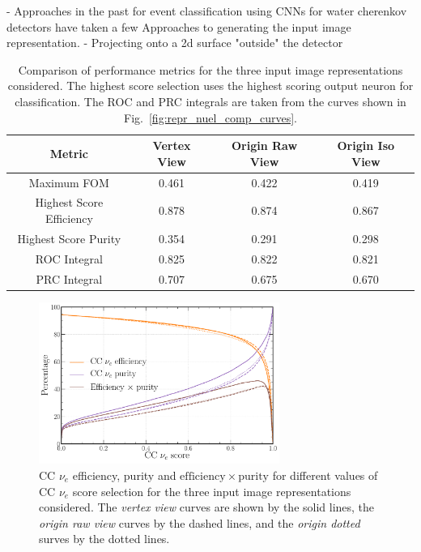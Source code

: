 - Approaches in the past for event classification using CNNs for water cherenkov detectors have
taken a few Approaches to generating the input image representation.
- Projecting onto a 2d surface "outside" the detector

\begin{table}
    \begin{tabular}{cccc}
        Metric                   & Vertex View & Origin Raw View & Origin Iso View \\
        \midrule
        Maximum FOM              & 0.461       & 0.422           & 0.419           \\
        Highest Score Efficiency & 0.878       & 0.874           & 0.867           \\
        Highest Score Purity     & 0.354       & 0.291           & 0.298           \\
        ROC Integral             & 0.825       & 0.822           & 0.821           \\
        PRC Integral             & 0.707       & 0.675           & 0.670           \\
    \end{tabular}
    \caption[Comparison of performance metrics for three input image representations.]
    {Comparison of performance metrics for the three input image representations considered. The
        highest score selection uses the highest scoring output neuron for classification. The ROC
        and PRC integrals are taken from the curves shown in
        Fig.~\ref{fig:repr_nuel_comp_curves}.}
    \label{tab:repr}
\end{table}

\begin{figure} %
    \includegraphics[width=0.7\textwidth]{diagrams/6-cvn/chipsnet/repr_nuel_eff_curves.pdf}
    \caption[CC $\nu_{e}$ efficiency and purity curves for the three input image representations.]
    {CC $\nu_{e}$ efficiency, purity and $\mathrm{efficiency}\times\mathrm{purity}$ for different
        values of CC $\nu_{e}$ score selection for the three input image representations
        considered. The \emph{vertex view} curves are shown by the solid lines, the \emph{origin
            raw view} curves by the dashed lines, and the \emph{origin dotted} surves by the dotted
        lines.}
    \label{fig:repr_nuel_eff_curves}
\end{figure}

